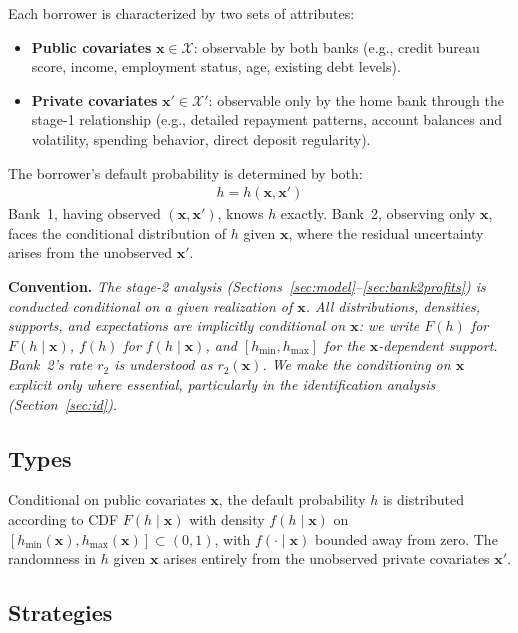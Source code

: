 \documentclass[12pt]{article}
\theoremstyle{plain}
\theoremstyle{plain}
\theoremstyle{definition}  %
\theoremstyle{remark}  %
\begin{document}
Each borrower is characterized by two sets of attributes:
\begin{itemize}
    \item \textbf{Public covariates} $\mathbf{x} \in \mathcal{X}$: observable by both banks (e.g., credit bureau score, income, employment status, age, existing debt levels).
    \item \textbf{Private covariates} $\mathbf{x}' \in \mathcal{X}'$: observable only by the home bank through the stage-1 relationship (e.g., detailed repayment patterns, account balances and volatility, spending behavior, direct deposit regularity).
\end{itemize}
The borrower's default probability is determined by both:
\begin{align}\label{eq:h_function}
    h = h(\mathbf{x}, \mathbf{x}')
\end{align}
Bank~1, having observed $(\mathbf{x}, \mathbf{x}')$, knows $h$ exactly. Bank~2, observing only $\mathbf{x}$, faces the conditional distribution of $h$ given $\mathbf{x}$, where the residual uncertainty arises from the unobserved $\mathbf{x}'$.

\medskip\noindent
\textbf{Convention.} \emph{The stage-2 analysis (Sections~\ref{sec:model}--\ref{sec:bank2profits}) is conducted conditional on a given realization of\/ $\mathbf{x}$. All distributions, densities, supports, and expectations are implicitly conditional on\/ $\mathbf{x}$: we write $F(h)$ for $F(h \mid \mathbf{x})$, $f(h)$ for $f(h \mid \mathbf{x})$, and $[h_{\min}, h_{\max}]$ for the $\mathbf{x}$-dependent support. Bank~2's rate $r_2$ is understood as $r_2(\mathbf{x})$. We make the conditioning on $\mathbf{x}$ explicit only where essential, particularly in the identification analysis (Section~\ref{sec:id}).}

\subsection{Types}

Conditional on public covariates $\mathbf{x}$, the default probability $h$ is distributed according to CDF $F(h \mid \mathbf{x})$ with density $f(h \mid \mathbf{x})$ on $[h_{\min}(\mathbf{x}), h_{\max}(\mathbf{x})] \subset (0,1)$, with $f(\cdot \mid \mathbf{x})$ bounded away from zero. The randomness in $h$ given $\mathbf{x}$ arises entirely from the unobserved private covariates $\mathbf{x}'$.

\subsection{Strategies}
\end{document}

